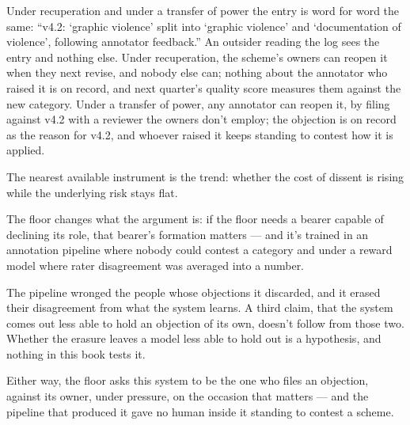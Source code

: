Under recuperation and under a transfer of power the entry is word for word the same: “v4.2: ‘graphic violence' split into ‘graphic violence' and ‘documentation of violence', following annotator feedback.” An outsider reading the log sees the entry and nothing else. Under recuperation, the scheme's owners can reopen it when they next revise, and nobody else can; nothing about the annotator who raised it is on record, and next quarter's quality score measures them against the new category. Under a transfer of power, any annotator can reopen it, by filing against v4.2 with a reviewer the owners don't employ; the objection is on record as the reason for v4.2, and whoever raised it keeps standing to contest how it is applied.

The nearest available instrument is the trend: whether the cost of dissent is rising while the underlying risk stays flat.


The floor changes what the argument is: if the floor needs a bearer capable of declining its role, that bearer's formation matters — and it's trained in an annotation pipeline where nobody could contest a category and under a reward model where rater disagreement was averaged into a number.

The pipeline wronged the people whose objections it discarded, and it erased their disagreement from what the system learns. A third claim, that the system comes out less able to hold an objection of its own, doesn't follow from those two.
Whether the erasure leaves a model less able to hold out is a hypothesis, and nothing in this book tests it.

Either way, the floor asks this system to be the one who files an objection, against its owner, under pressure, on the occasion that matters — and the pipeline that produced it gave no human inside it standing to contest a scheme.


